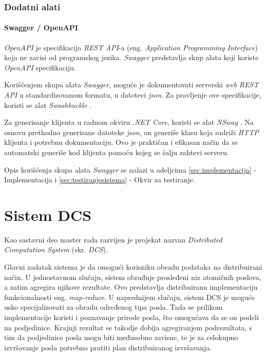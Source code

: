 \documentclass[12pt,oneside]{memoir}
\begin{document}
\subsection{Dodatni alati}
\label{sub:dodatnialati}

\subsubsection{Swagger / OpenAPI}

\emph{OpenAPI} \cite{OpenAPI} je specifikacija \emph{REST API}-a (eng. \emph{Application Programming Interface}) koja ne zavisi od programskog jezika. \emph{Swagger} \cite{Swagger} predstavlja skup alata koji koriste \emph{OpenAPI} specifikaciju.

Korišćenjem skupa alata \emph{Swagger}, moguće je dokumentovati serverski \emph{web REST API} u standardizovanom formatu, u datoteci \emph{json}. Za pravljenje ove specifikacije, koristi se alat \emph{Swashbuckle} \cite{Swashbuckle}.

Za generisanje klijenta u radnom okviru \emph{.NET Core}, koristi se alat \emph{NSwag} \cite{NSwag}. Na osnovu prethodno generisane datoteke \emph{json}, on generiše klasu koja sadriži \emph{HTTP} klijenta i potrebnu dokumentaciju. Ovo je praktičan i efikasan način da se automatski generiše kod klijenta pomoću kojeg se šalju zahtevi serveru.

Opis korišćenja skupa alata \emph{Swagger} se nalazi u odeljcima \ref{sec:implementacija} - Implementacija i \ref{sec:testiranjesistema} - Okvir za testiranje.


\chapter{Sistem DCS}
\label{chp:sistemdcs}

Kao sastavni deo master rada razvijen je projekat nazvan \emph{Distributed Computation System} (skr. \emph{DCS}).

Glavni zadatak sistema je da omogući korisniku obradu podataka na distribuirani način.
U jednostavnom slučaju, sistem obrađuje prosleđeni niz atomičnih poslova, a zatim agregira njihove rezultate. Ovo predstavlja distribuiranu implementaciju funkcionalnosti eng. \emph{map-reduce}.
U naprednijem slučaju, sistem DCS je moguće usko specijalizovati za obradu određenog tipa posla. Tada se prilikom implementacije koristi i poznavanje prirode posla, što omogućava da se on podeli na podjedinice. Krajnji rezultat se takodje dobija agregiranjem podrezultata, s tim da podjedinice posla mogu biti međusobno zavisne, te je za celokupno izvršavanje posla potrebno pratiti plan distribuiranog izvršavanja.
\end{document}
